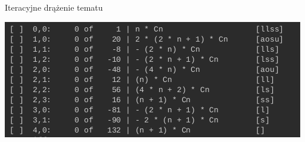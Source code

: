 \documentclass[final]{beamer}
\theoremstyle{bluetheorem}
\theoremstyle{bluetheorem}
\theoremstyle{greentheorem}
\begin{document}
\begin{frame}{Iteracyjne drążenie tematu}
    \begin{block}{}
        \begin{center}
            \includegraphics[width=.8\textwidth]{class_001.png}
        \end{center}
    \end{block}
\end{frame}
\end{document}
